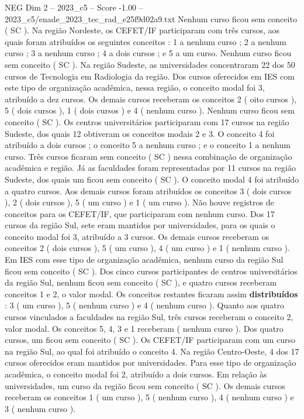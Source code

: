 \begin{textsample}{NEG Dim 2 – 2023\_c5 – Score -1.00 – 2023\_c5/enade\_2023\_tec\_rad\_e25f9d02a9.txt}
Nenhum curso ficou sem conceito ( SC ).
Na região Nordeste, os CEFET/IF participaram com três cursos, aos quais foram atribuídos os seguintes conceitos : 1 a nenhum curso ; 2 a nenhum curso ; 3 a nenhum curso ; 4 a dois cursos ; e 5 a um curso.
Nenhum curso ficou sem conceito ( SC ).
Na região Sudeste, as universidades concentraram 22 dos 50 cursos de Tecnologia em Radiologia da região.
Dos cursos oferecidos em IES com este tipo de organização acadêmica, nessa região, o conceito modal foi 3, atribuído a dez cursos.
Os demais cursos receberam os conceitos 2 ( oito cursos ), 5 ( dois cursos ), 1 ( dois cursos ) e 4 ( nenhum curso ).
Nenhum curso ficou sem conceito ( SC ).
Os centros universitários participaram com 17 cursos na região Sudeste, dos quais 12 obtiveram os conceitos modais 2 e 3.
O conceito 4 foi atribuído a dois cursos ; o conceito 5 a nenhum curso ; e o conceito 1 a nenhum curso.
Três cursos ficaram sem conceito ( SC ) nessa combinação de organização acadêmica e região.
Já as faculdades foram representadas por 11 cursos na região Sudeste, dos quais um ficou sem conceito ( SC ).
O conceito modal 4 foi atribuído a quatro cursos.
Aos demais cursos foram atribuídos os conceitos 3 ( dois cursos ), 2 ( dois cursos ), 5 ( um curso ) e 1 ( um curso ).
Não houve registros de conceitos para os CEFET/IF, que participaram com nenhum curso.
Dos 17 cursos da região Sul, sete eram mantidos por universidades, para os quais o conceito modal foi 3, atribuído a 3 cursos.
Os demais cursos receberam os conceitos 2 ( dois cursos ), 5 ( um curso ), 4 ( um curso ) e 1 ( nenhum curso ).
Em IES com esse tipo de organização acadêmica, nenhum curso da região Sul ficou sem conceito ( SC ).
Dos cinco cursos participantes de centros universitários da região Sul, nenhum ficou sem conceito ( SC ), e quatro cursos receberam conceitos 1 e 2, o valor modal.
Os conceitos restantes ficaram assim \textbf{distribuídos} : 3 ( um curso ), 5 ( nenhum curso ) e 4 ( nenhum curso ).
Quanto aos quatro cursos vinculados a faculdades na região Sul, três cursos receberam o conceito 2, valor modal.
Os conceitos 5, 4, 3 e 1 receberam ( nenhum curso ).
Dos quatro cursos, um ficou sem conceito ( SC ).
Os CEFET/IF participaram com um curso na região Sul, ao qual foi atribuído o conceito 4.
Na região Centro-Oeste, 4 dos 17 cursos oferecidos eram mantidos por universidades.
Para esse tipo de organização acadêmica, o conceito modal foi 2, atribuído a dois cursos.
Em relação às universidades, um curso da região ficou sem conceito ( SC ).
Os demais cursos receberam os conceitos 1 ( um curso ), 5 ( nenhum curso ), 4 ( nenhum curso ) e 3 ( nenhum curso ).

\end{textsample}
